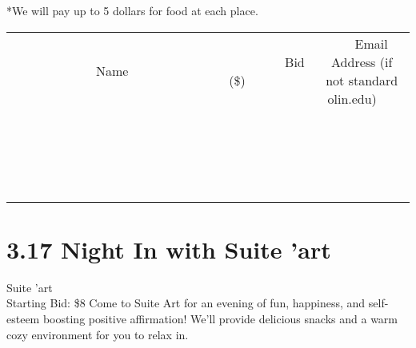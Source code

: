 \documentclass[11pt]{article}
\begin{document}
*We will pay up to 5 dollars for food at each place.
\\[3ex]
\begin{tabular}{c c c}
~~~~~~~~~~~~~Name~~~~~~~~~~~~~ & ~~~~~~~~~Bid (\$)~~~~~~~~~  & ~~~Email Address (if not standard olin.edu)~~~\\
 & & \\
\hline
 & & \\
\hline
 & & \\
\hline
 & & \\
\hline
 & & \\
\hline
 & & \\
\hline
 & & \\
\hline
 & & \\
\hline
 & & \\
\hline
 & & \\
\hline
 & & \\
\hline
 & & \\
\hline
 & & \\
\hline
 & & \\
\hline
 & & \\
\hline
 & & \\
\hline
 & & \\
\hline
 & & \\
\hline
 & & \\
\hline
\end{tabular}
\newpage
\section*{3.17 Night In with Suite 'art}
Suite 'art
\\
Starting Bid: \$8
\newline
Come to Suite Art for an evening of fun, happiness, and self-esteem boosting positive affirmation! We'll provide delicious snacks and a warm cozy environment for you to relax in. 
\end{document}
